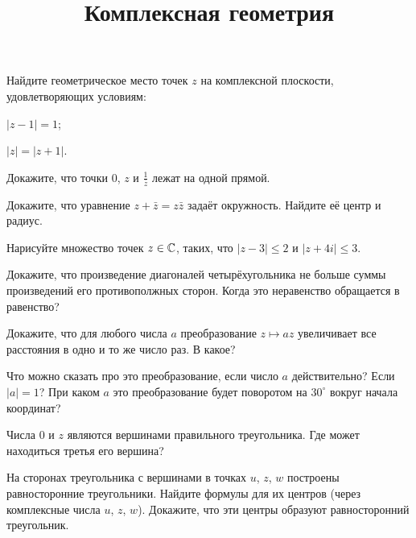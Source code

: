\documentclass[a4paper, 12pt, num=23, date=09.10.2019]{listok}
\begin{document}
\title{Комплексная геометрия}
\maketitle{}
\begin{problem}
	Найдите геометрическое место точек $z$ на комплексной плоскости, удовлетворяющих условиям:
	\begin{probparts}
		\item $|z - 1| = 1$;
		\item $|z| = |z + 1|$.
	\end{probparts}
\end{problem}
\begin{problem}
	Докажите, что точки $0$, $z$ и $\frac1{\bar z}$ лежат на одной прямой.
\end{problem}
\begin{problem}
	Докажите, что уравнение $z + \bar z = z\bar z$ задаёт окружность. Найдите её центр и радиус.
\end{problem}
\begin{problem}
	Нарисуйте множество точек $z \in \mathbb{C}$, таких, что $|z - 3| \le 2$ и $|z + 4i| \le 3$.
\end{problem}
\begin{problem}
	Докажите, что произведение диагоналей четырёхугольника не больше суммы произведений его противополжных сторон. Когда это неравенство обращается в равенство?
\end{problem}
\begin{problem}
	Докажите, что для любого числа $a$ преобразование $z \mapsto az$ увеличивает все расстояния в одно и то же число раз. В какое?
\end{problem}
\begin{problem}
	Что можно сказать про это преобразование, если число $a$ действительно? Если $|a| = 1$?
	При каком $a$ это преобразование будет поворотом на $30^\circ$ вокруг начала координат?
\end{problem}
\begin{problem}
\begin{probparts}
	\item Числа $0$ и $z$ являются вершинами правильного треугольника.
	Где может находиться третья его вершина?
	\item На сторонах треугольника с вершинами в точках $u$, $z$, $w$ построены равносторонние треугольники.
	Найдите формулы для их центров (через комплексные числа $u$, $z$, $w$). Докажите, что эти центры образуют равносторонний треугольник.
\end{probparts}
\end{problem}
\end{document}
